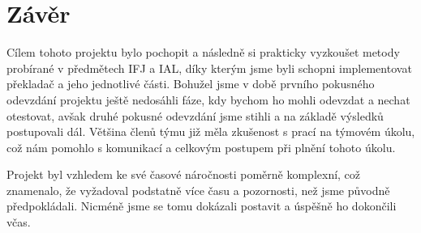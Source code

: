 \documentclass[a4paper, 12pt]{article} %
\begin{document}
    \section{Závěr}
        Cílem tohoto projektu bylo pochopit a následně si prakticky vyzkoušet metody 
        probírané v předmětech IFJ a IAL, díky kterým jsme byli schopni implementovat 
        překladač a jeho jednotlivé části. Bohužel jsme v době prvního pokusného odevzdání 
        projektu ještě nedosáhli fáze, kdy bychom ho mohli odevzdat a nechat otestovat,
        avšak druhé pokusné odevzdání jsme stihli a na základě výsledků postupovali dál.
        Většina členů týmu již měla zkušenost s prací na týmovém úkolu, což nám pomohlo
        s komunikací a celkovým postupem při plnění tohoto úkolu. 
        
        Projekt byl vzhledem ke své časové náročnosti poměrně komplexní, což znamenalo, 
        že vyžadoval podstatně více času a pozornosti, než jsme původně předpokládali. 
        Nicméně jsme se tomu dokázali postavit a úspěšně ho dokončili včas.

    
\end{document}
